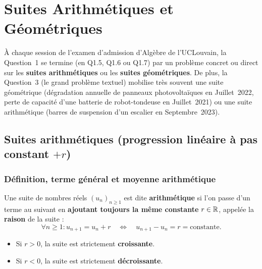 \chapter{Suites Arithmétiques et Géométriques}

À chaque session de l'examen d'admission d'Algèbre de l'UCLouvain, la Question~1 se termine (en Q1.5, Q1.6 ou Q1.7) par un problème concret ou direct sur les \textbf{suites arithmétiques} ou les \textbf{suites géométriques}. De plus, la Question~3 (le grand problème textuel) mobilise très souvent une suite géométrique (dégradation annuelle de panneaux photovoltaïques en Juillet~2022, perte de capacité d'une batterie de robot-tondeuse en Juillet~2021) ou une suite arithmétique (barres de suspension d'un escalier en Septembre~2023).

\section{Suites arithmétiques (progression linéaire à pas constant $+r$)}

\subsection{Définition, terme général et moyenne arithmétique}

\begin{definition}
Une suite de nombres réels $(u_n)_{n \ge 1}$ est dite \textbf{arithmétique} si l'on passe d'un terme au suivant en \textbf{ajoutant toujours la même constante} $r \in \mathbb{R}$, appelée la \textbf{raison} de la suite :
\[
    \boxed{\forall n \ge 1 : u_{n+1} = u_n + r \quad \Longleftrightarrow \quad u_{n+1} - u_n = r = \text{constante}}.
\]
\begin{itemize}
    \item Si $r > 0$, la suite est strictement \textbf{croissante}.
    \item Si $r < 0$, la suite est strictement \textbf{décroissante}.
\end{itemize}
\end{definition}

